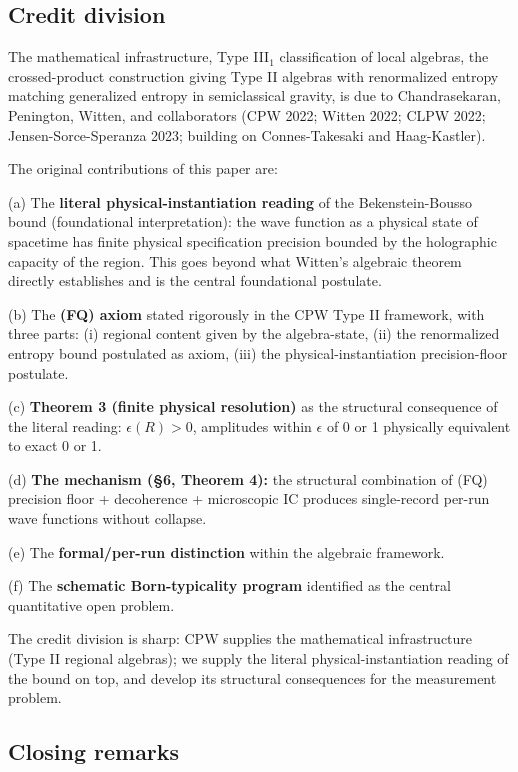 \documentclass[11pt,a4paper]{article}
\begin{document}
\subsection{Credit division}

The mathematical infrastructure, Type III$_1$ classification of local algebras, the crossed-product construction giving Type II algebras with renormalized entropy matching generalized entropy in semiclassical gravity, is due to Chandrasekaran, Penington, Witten, and collaborators (CPW 2022; Witten 2022; CLPW 2022; Jensen-Sorce-Speranza 2023; building on Connes-Takesaki and Haag-Kastler).

The original contributions of this paper are:

(a) The \textbf{literal physical-instantiation reading} of the Bekenstein-Bousso bound (foundational interpretation): the wave function as a physical state of spacetime has finite physical specification precision bounded by the holographic capacity of the region. This goes beyond what Witten's algebraic theorem directly establishes and is the central foundational postulate.

(b) The \textbf{(FQ) axiom} stated rigorously in the CPW Type II framework, with three parts: (i) regional content given by the algebra-state, (ii) the renormalized entropy bound postulated as axiom, (iii) the physical-instantiation precision-floor postulate.

(c) \textbf{Theorem 3 (finite physical resolution)} as the structural consequence of the literal reading: $\epsilon(R) > 0$, amplitudes within $\epsilon$ of 0 or 1 physically equivalent to exact 0 or 1.

(d) \textbf{The mechanism (§6, Theorem 4):} the structural combination of (FQ) precision floor + decoherence + microscopic IC produces single-record per-run wave functions without collapse.

(e) The \textbf{formal/per-run distinction} within the algebraic framework.

(f) The \textbf{schematic Born-typicality program} identified as the central quantitative open problem.

The credit division is sharp: CPW supplies the mathematical infrastructure (Type II regional algebras); we supply the literal physical-instantiation reading of the bound on top, and develop its structural consequences for the measurement problem.

\subsection{Closing remarks}
\end{document}
